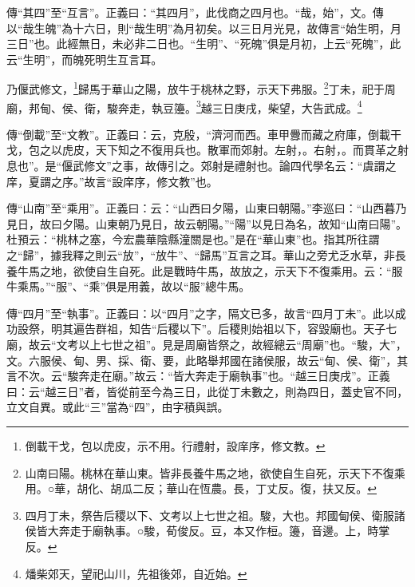 {\noindent\zhuan{}\fzbyks 傳“其四”至“互言”。正義曰：“其四月”，此伐商之四月也。“哉，始”，文。傳以“哉生魄”為十六日，則“哉生明”為月初矣。以三日月光見，故傳言“始生明，月三日”也。此經無日，未必非二日也。“生明”、“死魄”俱是月初，上云“死魄”，此云“生明”，而魄死明生互言耳。 \par}

乃偃武修文，\footnote{倒載干戈，包以虎皮，示不用。行禮射，設庠序，修文教。}歸馬于華山之陽，放牛于桃林之野，示天下弗服。\footnote{山南曰陽。桃林在華山東。皆非長養牛馬之地，欲使自生自死，示天下不復乘用。○華，胡化、胡瓜二反；華山在恆農。長，丁丈反。復，扶又反。}丁未，祀于周廟，邦甸、侯、衛，駿奔走，執豆籩。\footnote{四月丁未，祭告后稷以下、文考以上七世之祖。駿，大也。邦國甸侯、衛服諸侯皆大奔走于廟執事。○駿，荀俊反。豆，本又作梪。籩，音邊。上，時掌反。}越三日庚戌，柴望，大告武成。\footnote{燔柴郊天，望祀山川，先祖後郊，自近始。}

{\noindent\zhuan{}\fzbyks 傳“倒載”至“文教”。正義曰：云，克殷，“濟河而西。車甲釁而藏之府庫，倒載干戈，包之以虎皮，天下知之不復用兵也。散軍而郊射。左射，。右射，。而貫革之射息也”。是“偃武修文”之事，故傳引之。郊射是禮射也。論四代學名云：“虞謂之庠，夏謂之序。”故言“設庠序，修文教”也。 \par}

{\noindent\zhuan{}\fzbyks 傳“山南”至“乘用”。正義曰：云：“山西曰夕陽，山東曰朝陽。”李巡曰：“山西暮乃見日，故曰夕陽。山東朝乃見日，故云朝陽。”“陽”以見日為名，故知“山南曰陽”。杜預云：“桃林之塞，今宏農華陰縣潼關是也。”是在“華山東”也。指其所往謂之“歸”，據我釋之則云“放”，“放牛”、“歸馬”互言之耳。華山之旁尤乏水草，非長養牛馬之地，欲使自生自死。此是戰時牛馬，故放之，示天下不復乘用。云：“服牛乘馬。”“服”、“乘”俱是用義，故以“服”總牛馬。 \par}

{\noindent\zhuan{}\fzbyks 傳“四月”至“執事”。正義曰：以“四月”之字，隔文已多，故言“四月丁未”。此以成功設祭，明其遍告群祖，知告“后稷以下”。后稷則始祖以下，容毀廟也。天子七廟，故云“文考以上七世之祖”。見是周廟皆祭之，故經總云“周廟”也。“駿，大”，文。六服侯、甸、男、採、衛、要，此略舉邦國在諸侯服，故云“甸、侯、衛”，其言不次。云“駿奔走在廟。”故云：“皆大奔走于廟執事”也。“越三日庚戌”。正義曰：云“越三日”者，皆從前至今為三日，此從丁未數之，則為四日，蓋史官不同，立文自異。或此“三”當為“四”，由字積與誤。 \par}

